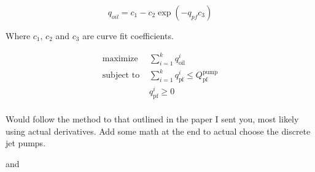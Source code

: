 \documentclass[12 pt]{report}
\begin{document}
\begin{equation*}
    q_{oil} = c_{1} - c_{2} \exp{(-q_{pf} c_{3})}
\end{equation*}

Where $c_{1}$, $c_{2}$ and $c_{3}$ are curve fit coefficients.

\begin{equation*}
\begin{aligned}
    \text{maximize } & \sum_{i=1}^{k} q_{\text{oil}}^{i} \\
    \text{subject to } & \sum_{i=1}^{k} q_{\text{pf}}^{i} \leq Q_{\text{pf}}^{\text{pump}} \\
    & q_{\text{pf}}^{i} \geq 0 \\
\end{aligned}
\end{equation*}

Would follow the method to that outlined in the paper I sent you, most likely using actual derivatives. Add some math at the end to actual choose the discrete jet pumps.

\cite{gas_lift_econ} and \cite{gas_lift_quasi}

\printbibliography
\end{document}
